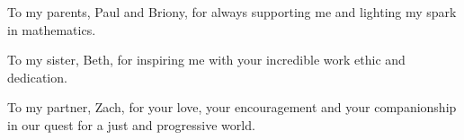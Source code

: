 \begin{dedication}
 To my parents, Paul and Briony, for always supporting me and lighting my spark in mathematics.
 
 To my sister, Beth, for inspiring me with your incredible work ethic and dedication.
 
To my partner, Zach, for your love, your encouragement and your companionship in our quest for a just and progressive world.
\end{dedication}